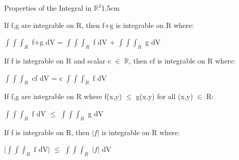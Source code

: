     \vspace{0.5cm}



    \begin{ltheorem}{Properties of the Integral in $\mathbb{R}^3$}{1.5cm}
        \item If f,g are integrable on R, then f+g is integrable on R where:
        
            \hspace{0.5cm}
            $\int \int \int_R$ f+g dV
            = $\int \int \int_R$ f dV + $\int \int \int_R$ g dV

        \item If f is integrable on R and scalar c $\in$ $\mathbb{R}$,
            then cf is integrable on R where:
        
            \hspace{0.5cm}
            $\int \int \int_R$ cf dV
            = c $\int \int \int_R$ f dV

        \item If f,g are integrable on R where f(x,y) $\leq$ g(x,y) for all
            (x,y) $\in$ R:
        
            \hspace{0.5cm}
            $\int \int \int_R$ f dV
            $\leq$ $\int \int \int_R$ g dV

        \item If f is integrable on R, then $|f|$ is integrable on R where:
        
            \hspace{0.5cm}
            $|$$\int \int \int_R$ f dV$|$
            $\leq$ $\int \int \int_R$ $|f|$ dV
    \end{ltheorem}

    \newpage





